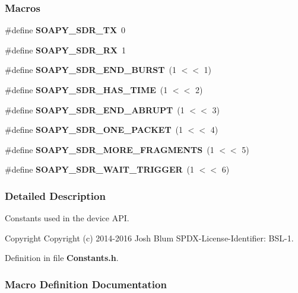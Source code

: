 \subsubsection*{Macros}
\begin{DoxyCompactItemize}
\item 
\#define {\bf S\+O\+A\+P\+Y\+\_\+\+S\+D\+R\+\_\+\+TX}~0
\item 
\#define {\bf S\+O\+A\+P\+Y\+\_\+\+S\+D\+R\+\_\+\+RX}~1
\item 
\#define {\bf S\+O\+A\+P\+Y\+\_\+\+S\+D\+R\+\_\+\+E\+N\+D\+\_\+\+B\+U\+R\+ST}~(1 $<$$<$ 1)
\item 
\#define {\bf S\+O\+A\+P\+Y\+\_\+\+S\+D\+R\+\_\+\+H\+A\+S\+\_\+\+T\+I\+ME}~(1 $<$$<$ 2)
\item 
\#define {\bf S\+O\+A\+P\+Y\+\_\+\+S\+D\+R\+\_\+\+E\+N\+D\+\_\+\+A\+B\+R\+U\+PT}~(1 $<$$<$ 3)
\item 
\#define {\bf S\+O\+A\+P\+Y\+\_\+\+S\+D\+R\+\_\+\+O\+N\+E\+\_\+\+P\+A\+C\+K\+ET}~(1 $<$$<$ 4)
\item 
\#define {\bf S\+O\+A\+P\+Y\+\_\+\+S\+D\+R\+\_\+\+M\+O\+R\+E\+\_\+\+F\+R\+A\+G\+M\+E\+N\+TS}~(1 $<$$<$ 5)
\item 
\#define {\bf S\+O\+A\+P\+Y\+\_\+\+S\+D\+R\+\_\+\+W\+A\+I\+T\+\_\+\+T\+R\+I\+G\+G\+ER}~(1 $<$$<$ 6)
\end{DoxyCompactItemize}


\subsubsection{Detailed Description}
Constants used in the device A\+PI. 

\begin{DoxyCopyright}{Copyright}
Copyright (c) 2014-\/2016 Josh Blum S\+P\+D\+X-\/\+License-\/\+Identifier\+: B\+S\+L-\/1. 
\end{DoxyCopyright}


Definition in file {\bf Constants.\+h}.



\subsubsection{Macro Definition Documentation}
